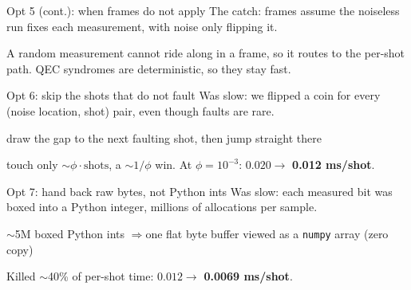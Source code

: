 \documentclass[aspectratio=169]{beamer}
\newcommand{\code}[1]{\texttt{#1}}
\begin{document}
\begin{frame}{Opt 5 (cont.): when frames do not apply}
  \alert{The catch:} frames assume the noiseless run fixes each measurement, with noise only flipping it.
  \vfill
  \begin{center}
  \end{center}
  \vfill
  \begin{center}\small A random measurement cannot ride along in a frame, so it routes to the per-shot path. QEC syndromes are deterministic, so they stay fast.\end{center}
\end{frame}

\begin{frame}{Opt 6: skip the shots that do not fault}
  \alert{Was slow:} we flipped a coin for every (noise location, shot) pair, even though faults are rare.
  \vfill
  \begin{center}\large draw the gap to the next faulting shot, then jump straight there\end{center}
  \vfill
  \begin{center}\large touch only $\sim\phi\cdot\text{shots}$, a $\sim 1/\phi$ win. At $\phi=10^{-3}$: $0.020 \to$ \textbf{0.012 ms/shot}.\end{center}
\end{frame}

\begin{frame}{Opt 7: hand back raw bytes, not Python ints}
  \alert{Was slow:} each measured bit was boxed into a Python integer, millions of allocations per sample.
  \vfill
  \begin{center}\large
    $\sim$5M boxed Python ints \quad$\Longrightarrow$\quad one flat byte buffer viewed as a \code{numpy} array (zero copy)
  \end{center}
  \vfill
  \begin{center}\large Killed $\sim$40\% of per-shot time: $0.012 \to$ \textbf{0.0069 ms/shot}.\end{center}
\end{frame}
\end{document}
